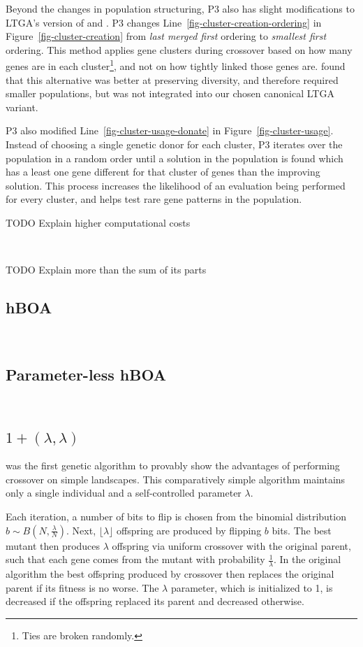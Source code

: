\documentclass[twoside]{article}
\begin{document}
Beyond the changes in population structuring, P3 also has slight modifications to
LTGA's version of  and .
P3 changes Line~\ref{fig-cluster-creation-ordering} in Figure~\ref{fig-cluster-creation}
from \emph{last merged first} ordering to \emph{smallest first} ordering.
This method applies gene clusters during crossover based on how many genes
are in each cluster\footnote{Ties are broken randomly.}, and not on how tightly linked those genes are.
\cite{goldman:2012:ltga} found that this alternative was better at preserving
diversity, and therefore required smaller populations, but was not integrated into
our chosen canonical LTGA variant.

P3 also modified Line~\ref{fig-cluster-usage-donate} in Figure~\ref{fig-cluster-usage}.
Instead of choosing a single genetic donor for each cluster, P3 iterates over the
population in a random order until a solution in the population is found which
has a least one gene different for that cluster of genes than the improving solution.
This process increases the likelihood of an evaluation being performed for every cluster,
and helps test rare gene patterns in the population.

TODO Explain higher computational costs

~\cite{hornby:2006:alps}


TODO Explain more than the sum of its parts

\subsection{hBOA}

~\cite{pelikan:2006:hboa}

\subsection{Parameter-less hBOA}
~\cite{pelikan:2004:parameterlesshboa}

\subsection{$1+(\lambda, \lambda)$}
\cite{doerr:2013:lambdalambda} was the first genetic algorithm to provably show
the advantages of performing crossover on simple landscapes. This comparatively simple
algorithm maintains only a single individual and a self-controlled parameter $\lambda$.

Each iteration, a number of bits to flip is chosen from the binomial distribution $b\sim B(N, \frac{\lambda}{N})$.
Next, $\lfloor\lambda\rfloor$ offspring are produced by flipping $b$ bits. The
best mutant then produces $\lambda$ offspring via uniform crossover with the original parent, such that each gene comes from the
mutant with probability $\frac{1}{\lambda}$. In the original algorithm the best
offspring produced by crossover then replaces the original parent if its fitness is no worse.
The $\lambda$ parameter, which is initialized to 1, is decreased if the offspring replaced
its parent and decreased otherwise.
\end{document}
